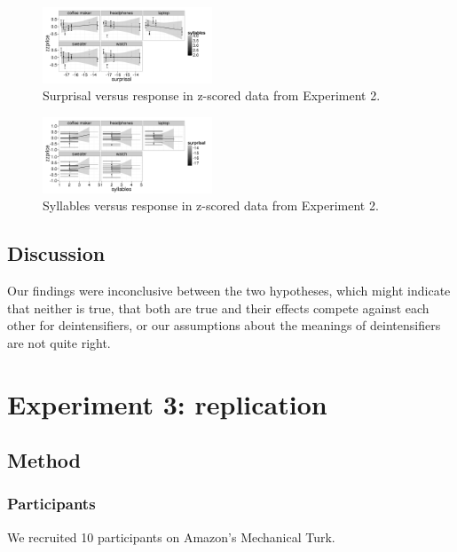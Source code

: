 \documentclass[10pt,letterpaper]{article}
\begin{document}
    \begin{figure}[ht]
    \begin{center}
    \includegraphics[width=0.45\textwidth]{exp2-zz.png}
    \end{center}
    \caption{Surprisal versus response in z-scored data from Experiment 2.} 
    \label{exp2-zz}
    \end{figure}
    
    \begin{figure}[ht]
    \begin{center}
    \includegraphics[width=0.45\textwidth]{exp2-zz-syllables.png}
    \end{center}
    \caption{Syllables versus response in z-scored data from Experiment 2.} 
    \label{exp2-zz-syllables}
    \end{figure}
    
  \subsection{Discussion}
  
    Our findings were inconclusive between the two hypotheses, which might indicate that neither is true, that both are true and their effects compete against each other for deintensifiers, or our assumptions about the meanings of deintensifiers are not quite right.

\section{Experiment 3: replication}
  \subsection{Method}
    \subsubsection{Participants}
      We recruited 10 participants on Amazon's Mechanical Turk.
\end{document}
